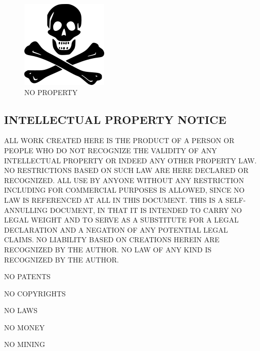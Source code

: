 \begin{figure}[htbp]
\centering
\includegraphics{images/jollyroger.png}
\caption{NO PROPERTY}
\end{figure}

\subsection{INTELLECTUAL PROPERTY
NOTICE}\label{intellectual-property-notice}

ALL WORK CREATED HERE IS THE PRODUCT OF A PERSON OR PEOPLE WHO DO NOT
RECOGNIZE THE VALIDITY OF ANY INTELLECTUAL PROPERTY OR INDEED ANY OTHER
PROPERTY LAW. NO RESTRICTIONS BASED ON SUCH LAW ARE HERE DECLARED OR
RECOGNIZED. ALL USE BY ANYONE WITHOUT ANY RESTRICTION INCLUDING FOR
COMMERCIAL PURPOSES IS ALLOWED, SINCE NO LAW IS REFERENCED AT ALL IN
THIS DOCUMENT. THIS IS A SELF-ANNULLING DOCUMENT, IN THAT IT IS INTENDED
TO CARRY NO LEGAL WEIGHT AND TO SERVE AS A SUBSTITUTE FOR A LEGAL
DECLARATION AND A NEGATION OF ANY POTENTIAL LEGAL CLAIMS. NO LIABILITY
BASED ON CREATIONS HEREIN ARE RECOGNIZED BY THE AUTHOR. NO LAW OF ANY
KIND IS RECOGNIZED BY THE AUTHOR.

NO PATENTS

NO COPYRIGHTS

NO LAWS

NO MONEY

NO MINING
